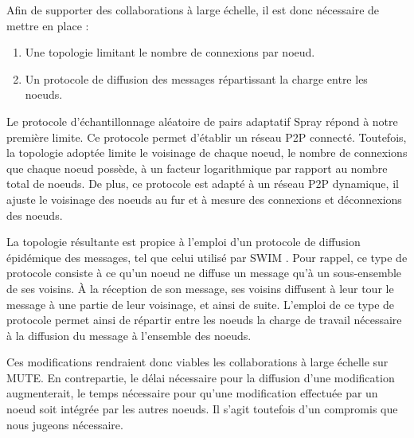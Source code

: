 Afin de supporter des collaborations à large échelle, il est donc nécessaire de mettre en place :
\begin{enumerate}
    \item Une topologie limitant le nombre de connexions par noeud.
    \item Un protocole de diffusion des messages répartissant la charge entre les noeuds.
\end{enumerate}

Le protocole d'échantillonnage aléatoire de pairs adaptatif Spray \cite{2018-spray-nedelec} répond à notre première limite.
Ce protocole permet d'établir un réseau \ac{P2P} connecté.
Toutefois, la topologie adoptée limite le voisinage de chaque noeud, \ie le nombre de connexions que chaque noeud possède, à un facteur logarithmique par rapport au nombre total de noeuds.
De plus, ce protocole est adapté à un réseau \ac{P2P} dynamique, \ie il ajuste le voisinage des noeuds au fur et à mesure des connexions et déconnexions des noeuds.

La topologie résultante est propice à l'emploi d'un protocole de diffusion épidémique des messages, tel que celui utilisé par SWIM .
Pour rappel, ce type de protocole consiste à ce qu'un noeud ne diffuse un message qu'à un sous-ensemble de ses voisins.
À la réception de son message, ses voisins diffusent à leur tour le message à une partie de leur voisinage, et ainsi de suite.
L'emploi de ce type de protocole permet ainsi de répartir entre les noeuds la charge de travail nécessaire à la diffusion du message à l'ensemble des noeuds.

Ces modifications rendraient donc viables les collaborations à large échelle sur \ac{MUTE}.
En contrepartie, le délai nécessaire pour la diffusion d'une modification augmenterait, \ie le temps nécessaire pour qu'une modification effectuée par un noeud soit intégrée par les autres noeuds.
Il s'agit toutefois d'un compromis que nous jugeons nécessaire.
